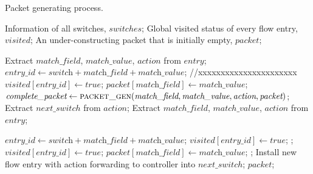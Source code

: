\begin {tcolorbox}[blanker,float=tbp,
grow to left by=1cm, grow to right by=1cm]
\begin{algorithm}[H]

  \caption{Packet generating process.}
  
  \begin{algorithmic}[1]
    \Require
      Information of all switches, $switches$;
      Global visited status of every flow entry, $visited$;
      An under-constructing packet that is initially empty, $packet$; 

          \State Extract $match\_field$, $match\_value$, $action$ from $entry$;
          \State $entry\_id \gets \textit{switch} + \textit{match\_field} + \textit{match\_value}$;  
          \State //xxxxxxxxxxxxxxxxxxxxxx
            \State $\textit{visited}[\textit{entry\_id}] \gets true$;
            \State $packet[\textit{match\_field}] \gets \textit{match\_value}$;
            \State $\textit{complete\_packet} \gets \Call{packet\_gen}{\textit{match\_field}, \textit{match\_value}, \textit{action}, \textit{packet}}$;
          \EndIf
      \EndFor
        \EndFor
    \EndFunction
    \State
      \State Extract $next\_switch$ from $action$;
        \State Extract $match\_field$, $match\_value$, $action$ from $entry$;
  \end{algorithmic}
\end{algorithm}
\end{tcolorbox}

\begin {tcolorbox}[blanker,float=tbp,
grow to left by=1cm, grow to right by=1cm]
\begin{algorithm}[H]
  \begin{algorithmic}[1]
        \State $\textit{entry\_id} \gets \textit{switch} + \textit{match\_field} + \textit{match\_value}$;
            \State $\textit{visited}[\textit{entry\_id}] \gets true$;
            \State \Return {};
            \State $\textit{visited}[\textit{entry\_id}] \gets true$;
            \State $\textit{packet}[\textit{match\_field}] \gets \textit{match\_value}$;
            \State \Return {};
          \EndIf
        \EndIf
      \EndFor
      \State Install new flow entry with action forwarding to controller into $next\_switch$;
      \State \Return $packet$;
    \EndFunction
  \end{algorithmic}
\end{algorithm}
\end{tcolorbox}


